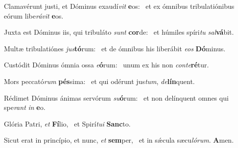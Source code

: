 \item Clamavérunt justi, et Dóminus exaudí\textit{vit} \textbf{e}os:~\psstar{} et ex ómnibus tribulatiónibus eórum libe\textit{rávit} \textbf{e}os.
\item Juxta est Dóminus iis, qui tribuláto \textit{sunt} \textbf{cor}de:~\psstar{} et húmiles spíri\textit{tu} \textit{sal}\textbf{vá}bit.
\item Multæ tribulatiónes \textit{jus}\textbf{tó}\-rum:~\psstar{} et de ómnibus his liberábit \textit{eos} \textbf{Dó}minus.
\item Custódit Dóminus ómnia ossa \textit{e}\textbf{ó}rum:~\psstar{} unum ex his non \textit{conte}\textbf{ré}tur.
\item Mors peccató\textit{rum} \textbf{pés}sima:~\psstar{} et qui odérunt jus\textit{tum}, \textit{de}\textbf{lín}quent.
\item Rédimet Dóminus ánimas servórum \textit{su}\textbf{ó}rum:~\psstar{} et non delínquent omnes qui spe\textit{rant} \textit{in} \textbf{e}o.
\item Glória Patri, \textit{et} \textbf{Fí}lio,~\psstar{} et Spirí\textit{tui} \textbf{Sanc}to.
\item Sicut erat in princípio, et nunc, \textit{et} \textbf{sem}per,~\psstar{} et in sǽcula sæcu\textit{lórum}. \textbf{A}men.
